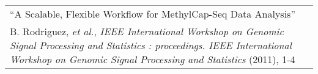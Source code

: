 \begin{tabularx}{\textwidth}{ X }
  ``A Scalable, Flexible Workflow for MethylCap-Seq Data Analysis'' \\
  \small{B. Rodriguez, \textit{et al.}, \textit{IEEE International Workshop on Genomic Signal Processing and Statistics : proceedings. IEEE International Workshop on Genomic Signal Processing and Statistics} (2011), 1-4} \\
\end{tabularx}
